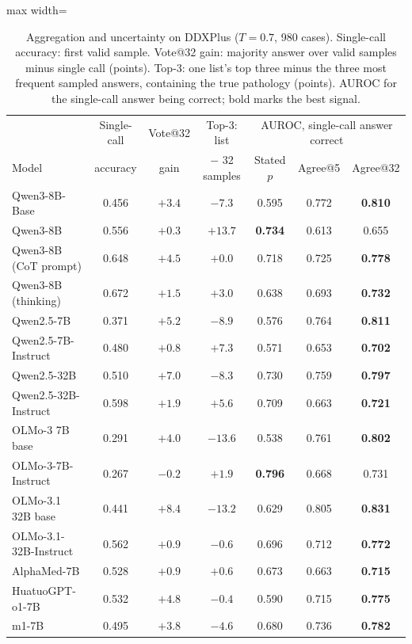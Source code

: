 \documentclass[wcp]{jmlr}
\begin{document}
\begin{table}[t]
\centering\small
\begin{adjustbox}{max width=\linewidth}
\begin{tabular}{lcccccc}
\toprule
 & Single-call & Vote@32 & Top-3: list & \multicolumn{3}{c}{AUROC, single-call answer correct} \\
Model & accuracy & gain & $-$ 32 samples & Stated $p$ & Agree@5 & Agree@32 \\
\midrule
Qwen3-8B-Base & 0.456 & $+3.4$ & $-7.3$ & 0.595 & 0.772 & \textbf{0.810} \\
Qwen3-8B & 0.556 & $+0.3$ & $+13.7$ & \textbf{0.734} & 0.613 & 0.655 \\
Qwen3-8B (CoT prompt) & 0.648 & $+4.5$ & $+0.0$ & 0.718 & 0.725 & \textbf{0.778} \\
Qwen3-8B (thinking) & 0.672 & $+1.5$ & $+3.0$ & 0.638 & 0.693 & \textbf{0.732} \\
Qwen2.5-7B & 0.371 & $+5.2$ & $-8.9$ & 0.576 & 0.764 & \textbf{0.811} \\
Qwen2.5-7B-Instruct & 0.480 & $+0.8$ & $+7.3$ & 0.571 & 0.653 & \textbf{0.702} \\
Qwen2.5-32B & 0.510 & $+7.0$ & $-8.3$ & 0.730 & 0.759 & \textbf{0.797} \\
Qwen2.5-32B-Instruct & 0.598 & $+1.9$ & $+5.6$ & 0.709 & 0.663 & \textbf{0.721} \\
\midrule
OLMo-3 7B base & 0.291 & $+4.0$ & $-13.6$ & 0.538 & 0.761 & \textbf{0.802} \\
OLMo-3-7B-Instruct & 0.267 & $-0.2$ & $+1.9$ & \textbf{0.796} & 0.668 & 0.731 \\
OLMo-3.1 32B base & 0.441 & $+8.4$ & $-13.2$ & 0.629 & 0.805 & \textbf{0.831} \\
OLMo-3.1-32B-Instruct & 0.562 & $+0.9$ & $-0.6$ & 0.696 & 0.712 & \textbf{0.772} \\
\midrule
AlphaMed-7B & 0.528 & $+0.9$ & $+0.6$ & 0.673 & 0.663 & \textbf{0.715} \\
HuatuoGPT-o1-7B & 0.532 & $+4.8$ & $-0.4$ & 0.590 & 0.715 & \textbf{0.775} \\
m1-7B & 0.495 & $+3.8$ & $-4.6$ & 0.680 & 0.736 & \textbf{0.782} \\
\bottomrule
\end{tabular}
\end{adjustbox}
\caption{Aggregation and uncertainty on DDXPlus ($T{=}0.7$, 980 cases). Single-call accuracy: first valid sample. Vote@32 gain: majority answer over valid samples minus single call (points). Top-3: one list's top three minus the three most frequent sampled answers, containing the true pathology (points). AUROC for the single-call answer being correct; bold marks the best signal.}
\label{tab:consequences}
\end{table}
\end{document}

